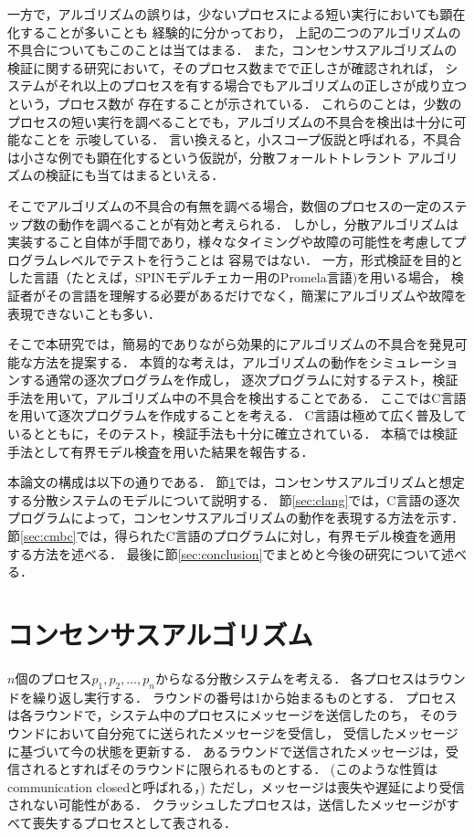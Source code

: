 \documentclass[technicalreport]{ieicej}
\theoremstyle{plain}
\begin{document}
一方で，アルゴリズムの誤りは，少ないプロセスによる短い実行においても顕在化することが多いことも
経験的に分かっており，
上記の二つのアルゴリズムの不具合についてもこのことは当てはまる．
また，コンセンサスアルゴリズムの検証に関する研究において，そのプロセス数までで正しさが確認されれば，
システムがそれ以上のプロセスを有する場合でもアルゴリズムの正しさが成り立つという，プロセス数が
存在することが示されている\cite{MaricSB17}．
これらのことは，少数のプロセスの短い実行を調べることでも，アルゴリズムの不具合を検出は十分に可能なことを
示唆している．
言い換えると，小スコープ仮説と呼ばれる，不具合は小さな例でも顕在化するという仮説が，分散フォールトトレラント
アルゴリズムの検証にも当てはまるといえる．

そこでアルゴリズムの不具合の有無を調べる場合，数個のプロセスの一定のステップ数の動作を調べることが有効と考えられる．
しかし，分散アルゴリズムは実装すること自体が手間であり，様々なタイミングや故障の可能性を考慮してプログラムレベルでテストを行うことは
容易ではない．
一方，形式検証を目的とした言語（たとえば，SPINモデルチェカー用のPromela言語\cite{spinbook})を用いる場合，
検証者がその言語を理解する必要があるだけでなく，簡潔にアルゴリズムや故障を表現できないことも多い．

そこで本研究では，簡易的でありながら効果的にアルゴリズムの不具合を発見可能な方法を提案する．
本質的な考えは，アルゴリズムの動作をシミュレーションする通常の逐次プログラムを作成し，
逐次プログラムに対するテスト，検証手法を用いて，アルゴリズム中の不具合を検出することである．
ここではC言語を用いて逐次プログラムを作成することを考える．
C言語は極めて広く普及しているとともに，そのテスト，検証手法も十分に確立されている．
本稿では検証手法として有界モデル検査を用いた結果を報告する．


本論文の構成は以下の通りである．
節\ref{sec:consensus}では，コンセンサスアルゴリズムと想定する分散システムのモデルについて説明する．
節\ref{sec:clang}では，C言語の逐次プログラムによって，コンセンサスアルゴリズムの動作を表現する方法を示す．
節\ref{sec:cmbc}では，得られたC言語のプログラムに対し，有界モデル検査を適用する方法を述べる．
最後に節\ref{sec:conclusion}でまとめと今後の研究について述べる．

\section{コンセンサスアルゴリズム}\label{sec:consensus}

$n$個のプロセス$p_1, p_2, \ldots, p_n$からなる分散システムを考える．
各プロセスはラウンドを繰り返し実行する．
ラウンドの番号は1から始まるものとする．
プロセスは各ラウンドで，システム中のプロセスにメッセージを送信したのち，
そのラウンドにおいて自分宛てに送られたメッセージを受信し，
受信したメッセージに基づいて今の状態を更新する．
あるラウンドで送信されたメッセージは，受信されるとすればそのラウンドに限られるものとする．
(このような性質はcommunication closedと呼ばれる，)
ただし，メッセージは喪失や遅延により受信されない可能性がある．
クラッシュしたプロセスは，送信したメッセージがすべて喪失するプロセスとして表される．
\end{document}
